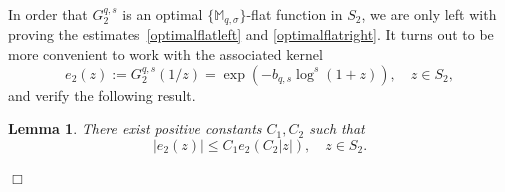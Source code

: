 \documentclass[11pt,a4paper]{article}
\theoremstyle{plain}
\newtheorem{lemma}[theo]{Lemma}
\theoremstyle{definition}
\newenvironment{proof1}{\medskip\par\noindent{\bf Proof.}}{\hfill $\Box$
\medskip\par}
\def\Ms{{\mathbb{M}}_{q,\sigma}}
\begin{document}
In order that $G_2^{q,s}$ is an optimal $\{\Ms\}$-flat function in $S_2$, we are only left with proving the
estimates~\eqref{optimalflatleft} and \eqref{optimalflatright}.
It turns out to be more convenient to work with the associated kernel
$$
e_2(z):=G_2^{q,s}(1/z)=\exp(-b_{q,s}\log^s(1+z)),\quad z\in S_2,
$$
and verify the following result.

\begin{lemma}\label{e2-bounds}
There exist positive constants $C_1,C_2$ such that
$$
|e_2(z)|\leq C_1 e_2(C_2 |z|),\quad z\in S_2.
$$
\end{lemma}
\begin{proof1}
%	

\end{proof1}
\end{document}
